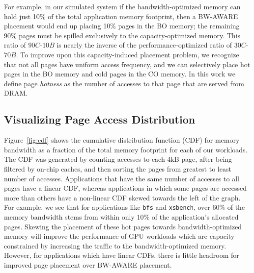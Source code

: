 For example, in our simulated system if the bandwidth-optimized memory
can hold just 10\% of the total application memory footprint, then a BW-AWARE placement would end up placing
10\% pages in the BO memory; the
remaining 90\% pages must be spilled exclusively to the capacity-optimized memory.  This ratio of
$90C$-$10B$ is nearly the inverse of the performance-optimized ratio of $30C$-$70B$.  
To improve upon this capacity-induced placement problem, we recognize
that not all pages have uniform access frequency, and we can selectively place
hot pages in the BO memory and cold pages in the CO memory. 
{\color{black}In this work we define page \textit{hotness} as the number of accesses to that page that 
are served from DRAM.}


\subsection{Visualizing Page Access Distribution}
\label{annotation}
Figure~\ref{fig:cdf} shows the cumulative distribution function (CDF) 
for memory bandwidth as a fraction of the total
memory footprint for each of our workloads. The CDF was generated by counting
accesses to each 4kB page, after being filtered by on-chip caches, and then sorting
the pages from greatest to least number of accesses.
Applications that have the same number of accesses to all
pages have a linear CDF, whereas applications in which some pages are accessed
more than others have a non-linear CDF skewed towards the left of the
graph. For example, we see that for applications like {\tt bfs} and {\tt xsbench}, over 60\% of
the memory bandwidth stems from within only 10\% of the application's allocated pages.  Skewing the 
placement of these hot pages towards bandwidth-optimized memory will improve the performance
of GPU workloads which are capacity constrained by increasing the traffic to the bandwidth-optimized 
memory. However, for applications which have linear CDFs, there is little headroom for 
improved page placement over BW-AWARE placement.

